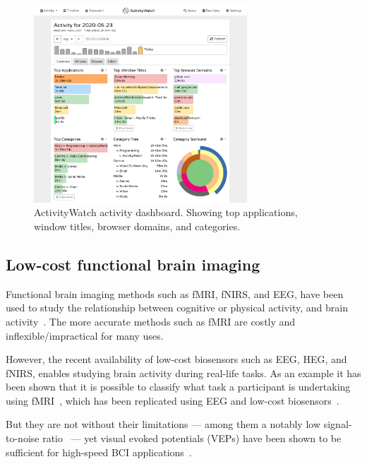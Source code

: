 \documentclass{IEEEtran}
\begin{document}
\begin{refsection}
\begin{figure}[h]
\centering
\includegraphics[width=8cm]{img/screenshot-aw-activity.png}
\caption{ActivityWatch activity dashboard. Showing top applications, window titles, browser domains, and categories.}\label{fig:aw}
\end{figure}


\subsection{Low-cost functional brain imaging}

Functional brain imaging methods such as fMRI, fNIRS, and EEG, have been used to study the relationship between cognitive or physical activity, and brain activity~\cite{floyd_decoding_2017}\cite{hong_classification_2015}\cite{fucci_replication_2019}. The more accurate methods such as fMRI are costly and inflexible/impractical for many uses.

However, the recent availability of low-cost biosensors such as EEG, HEG, and fNIRS, enables studying brain activity during real-life tasks. As an example it has been shown that it is possible to classify what task a participant is undertaking using fMRI~\cite{floyd_decoding_2017}, which has been replicated using EEG and low-cost biosensors~\cite{fucci_replication_2019}.

But they are not without their limitations --- among them a notably low signal-to-noise ratio~\cite{mcfarland_eeg-based_2017} --- yet visual evoked potentials (VEPs) have been shown to be sufficient for high-speed BCI applications~\cite{spuler_high-speed_2017}.



\end{refsection}
\end{document}
